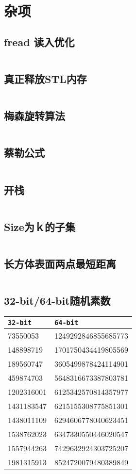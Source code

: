 \chapter{杂项}
\section{fread 读入优化}
\inputminted{cpp}{./hint/input-acceleration.cpp}
\section{真正释放STL内存}
\inputminted{cpp}{./hint/STL-memory-release.cpp}
\section{梅森旋转算法}
\inputminted{cpp}{./hint/mersenne-twister.cpp}
\section{蔡勒公式}
\inputminted{cpp}{./hint/zeller.cpp}
\section{开栈}
\inputminted{cpp}{./hint/openstack.cpp}
\section{Size为ｋ的子集}
\inputminted{cpp}{./hint/subset-of-size-k.cpp}
\section{长方体表面两点最短距离}
\inputminted{cpp}{./hint/distance-on-surface-of-cuboid.cpp}
\section{32-bit/64-bit随机素数}
\begin{tabular}{|l|l|}
	\hline
	\texttt{32-bit} & \texttt{64-bit} \\
	\hline
	73550053 & 1249292846855685773 \\
	\hline
	148898719 & 1701750434419805569 \\
	\hline
	189560747 & 3605499878424114901 \\
	\hline
	459874703 & 5648316673387803781 \\
	\hline
	1202316001 & 6125342570814357977 \\
	\hline
	1431183547 & 6215155308775851301 \\
	\hline
	1438011109 & 6294606778040623451 \\
	\hline
	1538762023 & 6347330550446020547 \\
	\hline
	1557944263 & 7429632924303725207 \\
	\hline
	1981315913 & 8524720079480389849 \\
	\hline
\end{tabular}

